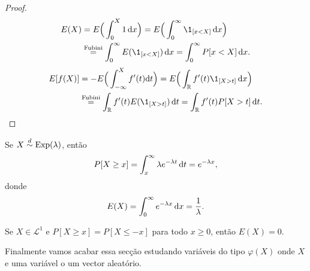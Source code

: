 \begin{proof}
  \begin{equation}
    \begin{split}
      E(X) & = E \Big( \int_0^X 1 \d x \Big) = E \Big( \int_0^\infty \1_{[x < X]} \d x \Big)\\
      & \overset{\text{Fubini}}= \int_0^\infty E(\1_{[x < X]}) \d x = \int_0^\infty P[x < X] \d x.
    \end{split}
  \end{equation}
    \begin{equation}
    \begin{split}
      E[f(X)] & = - E \Big( \int_{-\infty}^X f'(t)  \dd t \Big) = E \Big( \int_\bbR f'(t) \1_{[X>t]} \d x \Big)\\
      & \overset{\text{Fubini}}= \int_\bbR f'(t) E(\1_{[X>t]}) \d t = \int_\bbR f'(t) P[X>t] \d t.
    \end{split}
  \end{equation}
\end{proof}

\begin{example}
  Se $X \overset{d}\sim \operatorname{Exp}(\lambda)$, então
  \begin{equation}
    P[X \geq x] = \int_x^\infty \lambda e^{-\lambda t} \mathop{}\!\mathrm{d} t = e^{-\lambda x},
  \end{equation}
  donde
  \begin{equation}
    E(X) = \int_0^\infty e^{-\lambda x} \mathop{}\!\mathrm{d} x = \frac{1}{\lambda}.
  \end{equation}
\end{example}





\begin{exercise}
  Se $X \in \mathcal{L}^1$ e $P[X \geq x] = P[X \leq -x]$ para todo $x \geq 0$, então $E(X) = 0$.
\end{exercise}


Finalmente vamos acabar essa secção estudando variáveis  do tipo $\varphi(X)$ onde $X$ e uma variável o um vector aleatório.


